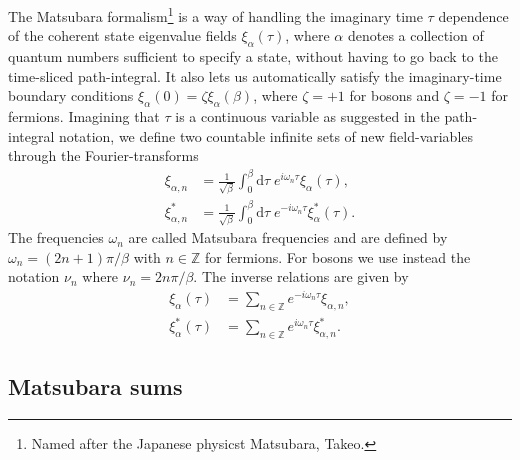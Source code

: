 The Matsubara formalism\footnote{Named after the Japanese physicst Matsubara, Takeo.} is a way of handling the imaginary time $\tau$
dependence of the coherent state eigenvalue fields $\xi_\alpha(\tau)$, where $\alpha$ denotes
a collection of quantum numbers sufficient to specify a state, without having to go back to the time-sliced path-integral. It also lets us
automatically satisfy the imaginary-time boundary conditions $\xi_\alpha(0) = \zeta\xi_\alpha(\beta)$, where $\zeta = +1$ for bosons
and $\zeta = -1$ for fermions. Imagining that $\tau$ is a continuous
variable as suggested in the path-integral notation, we define two countable infinite sets of new field-variables through the Fourier-transforms
\begin{subequations}
    \label{eq:Field:Mats:transformDef}
    \begin{align}
    \xi_{\alpha,n} &= \frac{1}{\sqrt{\beta}}\int_0^\beta\!\!\mathrm{d}\tau\;e^{i\omega_n\tau}\xi_\alpha(\tau),\label{eq:Field:Mats:transformDef:xi}\\
    \xi_{\alpha,n}^\ast &= \frac{1}{\sqrt{\beta}}\int_0^\beta\!\!\mathrm{d}\tau\;e^{-i\omega_n\tau}\xi_\alpha^\ast(\tau).\label{eq:Field:Mats:transformDef:xiAst}
    \end{align}
\end{subequations}
The frequencies $\omega_n$ are called Matsubara frequencies and are defined by $\omega_n = (2n+1)\pi/\beta$ with $n\in\mathbb{Z}$ for fermions. For bosons we use instead the notation
$\nu_n$ where $\nu_n = 2n\pi/\beta$. The inverse relations are given by 
\begin{subequations}
    \label{eq:Field:Mats:inverseTransform}
    \begin{align}
        \xi_\alpha(\tau) &= \sum_{n\in\mathbb{Z}}e^{-i\omega_n\tau}\xi_{\alpha,n},\label{eq:Field:Mats:inverseTransform:xi}\\
        \xi_\alpha^\ast(\tau) &= \sum_{n\in\mathbb{Z}}e^{i\omega_n\tau}\xi_{\alpha,n}^\ast.\label{eq:Field:Mats:inverseTransform:xiAst}
    \end{align}
\end{subequations}

\subsection{Matsubara sums}


